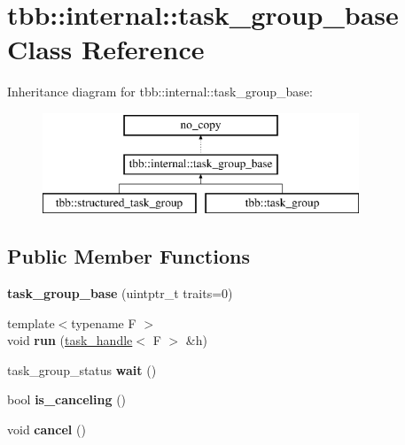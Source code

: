 \hypertarget{classtbb_1_1internal_1_1task__group__base}{}\section{tbb\+:\+:internal\+:\+:task\+\_\+group\+\_\+base Class Reference}
\label{classtbb_1_1internal_1_1task__group__base}
Inheritance diagram for tbb\+:\+:internal\+:\+:task\+\_\+group\+\_\+base\+:\begin{figure}[H]
\begin{center}
\leavevmode
\includegraphics[height=3.000000cm]{classtbb_1_1internal_1_1task__group__base}
\end{center}
\end{figure}
\subsection*{Public Member Functions}
\begin{DoxyCompactItemize}
\item 
\hypertarget{classtbb_1_1internal_1_1task__group__base_ac846a7be5035e1f5c929bda05e1b4401}{}{\bfseries task\+\_\+group\+\_\+base} (uintptr\+\_\+t traits=0)\label{classtbb_1_1internal_1_1task__group__base_ac846a7be5035e1f5c929bda05e1b4401}

\item 
\hypertarget{classtbb_1_1internal_1_1task__group__base_a8d8398153ad19d83a629aeb46991620b}{}{\footnotesize template$<$typename F $>$ }\\void {\bfseries run} (\hyperlink{classtbb_1_1task__handle}{task\+\_\+handle}$<$ F $>$ \&h)\label{classtbb_1_1internal_1_1task__group__base_a8d8398153ad19d83a629aeb46991620b}

\item 
\hypertarget{classtbb_1_1internal_1_1task__group__base_a9a05d8b3350796df951c701978cec816}{}task\+\_\+group\+\_\+status {\bfseries wait} ()\label{classtbb_1_1internal_1_1task__group__base_a9a05d8b3350796df951c701978cec816}

\item 
\hypertarget{classtbb_1_1internal_1_1task__group__base_a91b0943033a9e802cea00ac4af9e4ae2}{}bool {\bfseries is\+\_\+canceling} ()\label{classtbb_1_1internal_1_1task__group__base_a91b0943033a9e802cea00ac4af9e4ae2}

\item 
\hypertarget{classtbb_1_1internal_1_1task__group__base_a2c2b1b967f4d1924cf15c19e3854ff2f}{}void {\bfseries cancel} ()\label{classtbb_1_1internal_1_1task__group__base_a2c2b1b967f4d1924cf15c19e3854ff2f}

\end{DoxyCompactItemize}
